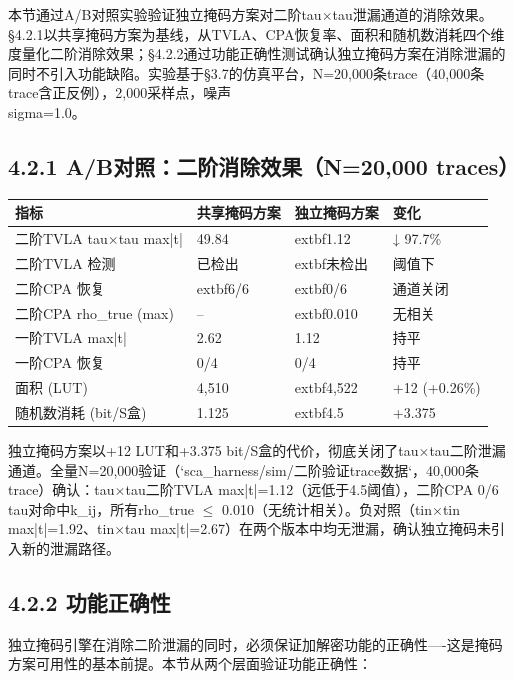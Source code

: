 \documentclass[journal]{IEEEtran}
\begin{document}
本节通过A/B对照实验验证独立掩码方案对二阶tau$\times$tau泄漏通道的消除效果。§4.2.1以共享掩码方案为基线，从TVLA、CPA恢复率、面积和随机数消耗四个维度量化二阶消除效果；§4.2.2通过功能正确性测试确认独立掩码方案在消除泄漏的同时不引入功能缺陷。实验基于§3.7的仿真平台，N=20,000条trace（40,000条trace含正反例），2,000采样点，噪声\\sigma=1.0。

\subsection{4.2.1 A/B对照：二阶消除效果（N=20,000 traces）}

\begin{table}[h]
\centering
\begin{tabular}{llll}
\hline
\textbf{指标} & \textbf{共享掩码方案} & \textbf{独立掩码方案} & \textbf{变化} \\
\hline
二阶TVLA tau$\times$tau max|t| & 49.84 & 	extbf{1.12} & ↓ 97.7\% \\
二阶TVLA 检测 & 已检出 & 	extbf{未检出} & 阈值下 \\
二阶CPA 恢复 & 	extbf{6/6} & 	extbf{0/6} & 通道关闭 \\
二阶CPA rho\_true (max) & -- & 	extbf{0.010} & 无相关 \\
一阶TVLA max|t| & 2.62 & 1.12 & 持平 \\
一阶CPA 恢复 & 0/4 & 0/4 & 持平 \\
面积 (LUT) & 4,510 & 	extbf{4,522} & +12 (+0.26\%) \\
随机数消耗 (bit/S盒) & 1.125 & 	extbf{4.5} & +3.375 \\
\hline
\end{tabular}
\end{table}

独立掩码方案以+12 LUT和+3.375 bit/S盒的代价，彻底关闭了tau$\times$tau二阶泄漏通道。全量N=20,000验证（`sca\_harness/sim/二阶验证trace数据`，40,000条trace）确认：tau$\times$tau二阶TVLA max|t|=1.12（远低于4.5阈值），二阶CPA 0/6 tau对命中k\_ij，所有rho\_true $\leq$ 0.010（无统计相关）。负对照（tin$\times$tin max|t|=1.92、tin$\times$tau max|t|=2.67）在两个版本中均无泄漏，确认独立掩码未引入新的泄漏路径。

\subsection{4.2.2 功能正确性}

独立掩码引擎在消除二阶泄漏的同时，必须保证加解密功能的正确性----这是掩码方案可用性的基本前提。本节从两个层面验证功能正确性：
\end{document}
